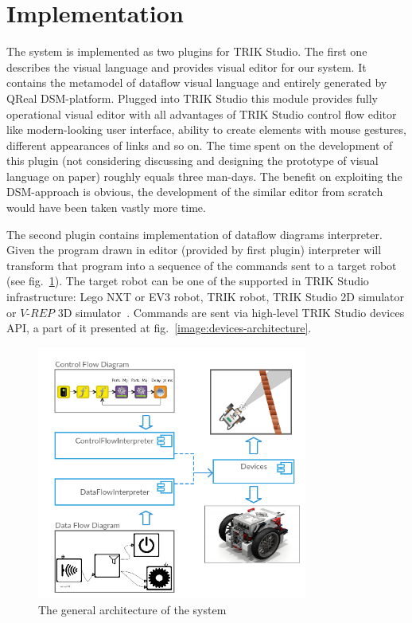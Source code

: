 \documentclass[conference,compsoc]{IEEEtran}
\begin{document}
\section{Implementation}
\label{sec:Implementation}
The system is implemented as two plugins for TRIK Studio. The first one describes the visual language and provides visual editor for our system. It contains the metamodel of dataflow visual language and entirely generated by QReal DSM-platform. Plugged into TRIK Studio this module provides fully operational visual editor with all advantages of TRIK Studio control flow editor like modern-looking user interface, ability to create elements with mouse gestures, different appearances of links and so on. The time spent on the development of this plugin (not considering discussing and designing the prototype of visual language on paper) roughly equals three man-days. The benefit on exploiting the DSM-approach is obvious, the development of the similar editor from scratch would have been taken vastly more time.

The second plugin contains implementation of dataflow diagrams interpreter. Given the program drawn in editor (provided by first plugin) interpreter will transform that program into a sequence of the commands sent to a target robot (see fig.~\ref{image:common-architecture}). The target robot can be one of the supported in TRIK Studio infrastructure: Lego NXT or EV3 robot, TRIK robot, TRIK Studio 2D simulator or $V\mbox{-}REP$ 3D simulator~\cite{rohmer2013v}. Commands are sent via high-level TRIK Studio devices API, a part of it presented at fig.~\ref{image:devices-architecture}.

\begin{figure}[ht]
	\centering
	\includegraphics[width=3.5in]{Common.png}
	\caption{The general architecture of the system}
	\label{image:common-architecture}
\end{figure}
\end{document}
